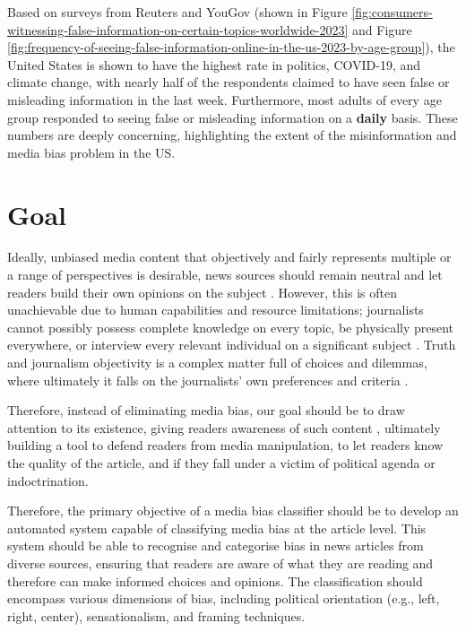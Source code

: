 Based on surveys from Reuters and YouGov (shown in Figure \ref{fig:consumers-witnessing-false-information-on-certain-topics-worldwide-2023} and Figure \ref{fig:frequency-of-seeing-false-information-online-in-the-us-2023-by-age-group}), the United States is shown to have the highest rate in politics, COVID-19, and climate change, with nearly half of the respondents claimed to have seen false or misleading information in the last week. Furthermore, most adults of every age group responded to seeing false or misleading information on a \textbf{daily} basis. These numbers are deeply concerning, highlighting the extent of the misinformation and media bias problem in the US.


\section{Goal}

Ideally, unbiased media content that objectively and fairly represents multiple or a range of perspectives is desirable, news sources should remain neutral and let readers build their own opinions on the subject \cite{reuters-2021-digital-news-report}. However, this is often unachievable due to human capabilities and resource limitations; journalists cannot possibly possess complete knowledge on every topic, be physically present everywhere, or interview every relevant individual on a significant subject \cite{allsides-2022-bias-definition}. Truth and journalism objectivity is a complex matter full of choices and dilemmas, where ultimately it falls on the journalists' own preferences and criteria \cite{boudana-2011-journalistic-objectivity}.

Therefore, instead of eliminating media bias, our goal should be to draw attention to its existence, giving readers awareness of such content \cite{spinde-2024-taxonomy}, ultimately building a tool to defend readers from media manipulation, to let readers know the quality of the article, and if they fall under a victim of political agenda or indoctrination.

Therefore, the primary objective of a media bias classifier should be to develop an automated system capable of classifying media bias at the article level. This system should be able to recognise and categorise bias in news articles from diverse sources, ensuring that readers are aware of what they are reading and therefore can make informed choices and opinions. The classification should encompass various dimensions of bias, including political orientation (e.g., left, right, center), sensationalism, and framing techniques.


